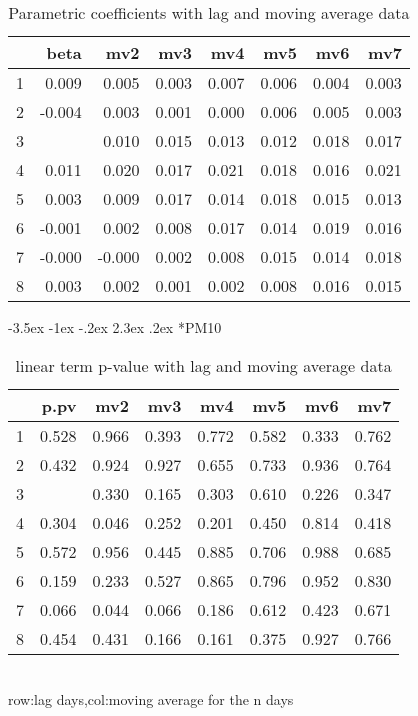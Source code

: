 \documentclass[a4paper, 12pt]{article}
\makeatletter
\def\large{\fontsize{14}{20}\selectfont}
\renewcommand\subsection{\@startsection {subsection}{1}{\z@}%
                                   {-3.5ex \@plus -1ex \@minus -.2ex}%
                                   {2.3ex \@plus.2ex}%
                                   {\centering\normalfont\large\bfseries}}
\makeatother
\begin{document}
\begin{table}[h]
\centering
\caption{Parametric coefficients with lag and moving average data}
\begin{tabular}{rrrrrrrr}
  \hline
 & beta & mv2 & mv3 & mv4 & mv5 & mv6 & mv7 \\
  \hline
1 & 0.009 & 0.005 & 0.003 & 0.007 & 0.006 & 0.004 & 0.003 \\
  2 & -0.004 & 0.003 & 0.001 & 0.000 & 0.006 & 0.005 & 0.003 \\
  3 & \color{red}{0.015} & 0.010 & 0.015 & 0.013 & 0.012 & 0.018 & 0.017 \\
  4 & 0.011 & 0.020 & 0.017 & 0.021 & 0.018 & 0.016 & 0.021 \\
  5 & 0.003 & 0.009 & 0.017 & 0.014 & 0.018 & 0.015 & 0.013 \\
  6 & -0.001 & 0.002 & 0.008 & 0.017 & 0.014 & 0.019 & 0.016 \\
  7 & -0.000 & -0.000 & 0.002 & 0.008 & 0.015 & 0.014 & 0.018 \\
  8 & 0.003 & 0.002 & 0.001 & 0.002 & 0.008 & 0.016 & 0.015 \\
   \hline
\end{tabular}
\end{table}
\clearpage
\subsection*{PM10}
\begin{table}[h]
\centering
\caption{linear term p-value with lag and moving average data}
\begin{tabular}{rrrrrrrr}
  \hline
 & p.pv & mv2 & mv3 & mv4 & mv5 & mv6 & mv7 \\
  \hline
1 & 0.528 & 0.966 & 0.393 & 0.772 & 0.582 & 0.333 & 0.762 \\
  2 & 0.432 & 0.924 & 0.927 & 0.655 & 0.733 & 0.936 & 0.764 \\
  3 & \color{red}{0.027} & 0.330 & 0.165 & 0.303 & 0.610 & 0.226 & 0.347 \\
  4 & 0.304 & 0.046 & 0.252 & 0.201 & 0.450 & 0.814 & 0.418 \\
  5 & 0.572 & 0.956 & 0.445 & 0.885 & 0.706 & 0.988 & 0.685 \\
  6 & 0.159 & 0.233 & 0.527 & 0.865 & 0.796 & 0.952 & 0.830 \\
  7 & 0.066 & 0.044 & 0.066 & 0.186 & 0.612 & 0.423 & 0.671 \\
  8 & 0.454 & 0.431 & 0.166 & 0.161 & 0.375 & 0.927 & 0.766 \\
   \hline
\end{tabular}
\\row:lag days,col:moving average for the n days
\end{table}
\end{document}
